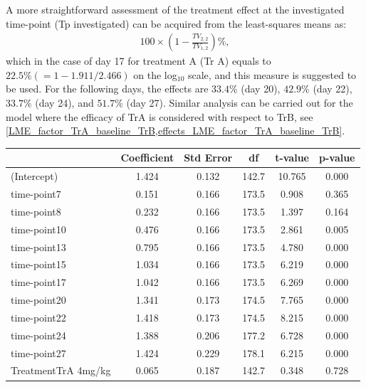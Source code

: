 A more straightforward assessment of the treatment effect at the investigated time-point (Tp investigated) can be acquired from the least-squares means as:
\begin{align}
	100\times \left(1-\frac{TV_{2,2}}{TV_{1,2}}\right) \%,
\end{align}
which in the case of day 17 for treatment A (Tr A) equals to $22.5\% (=1 - 1.911/2.466)$ on the log$_{10}$ scale, and this measure is suggested to be used.
For the following days, the effects are $33.4\%$ (day 20), $42.9\%$ (day 22), $33.7\%$ (day 24), and $51.7\%$ (day 27).
Similar analysis can be carried out for the model where the efficacy of TrA is considered with respect to TrB, see \cref{LME_factor_TrA_baseline_TrB,effects_LME_factor_TrA_baseline_TrB}.


\newpage
\begin{table}
	\centering
	\small
	\begin{tabular}{lccccc}
		\hline
		                                & Coefficient & Std Error & df    & t-value & p-value \\
		\hline
		(Intercept)                     & 1.424       & 0.132     & 142.7 & 10.765  & 0.000   \\
		time-point7                      & 0.151       & 0.166     & 173.5 & 0.908   & 0.365   \\
		time-point8                      & 0.232       & 0.166     & 173.5 & 1.397   & 0.164   \\
		time-point10                     & 0.476       & 0.166     & 173.5 & 2.861   & 0.005   \\
		time-point13                     & 0.795       & 0.166     & 173.5 & 4.780   & 0.000   \\
		time-point15                     & 1.034       & 0.166     & 173.5 & 6.219   & 0.000   \\
		time-point17                     & 1.042       & 0.166     & 173.5 & 6.269   & 0.000   \\
		time-point20                     & 1.341       & 0.173     & 174.5 & 7.765   & 0.000   \\
		time-point22                     & 1.418       & 0.173     & 174.5 & 8.215   & 0.000   \\
		time-point24                     & 1.388       & 0.206     & 177.2 & 6.728   & 0.000   \\
		time-point27                     & 1.424       & 0.229     & 178.1 & 6.215   & 0.000   \\
		TreatmentTrA 4mg/kg             & 0.065       & 0.187     & 142.7 & 0.348   & 0.728   \\

\end{tabular}
\end{table}

